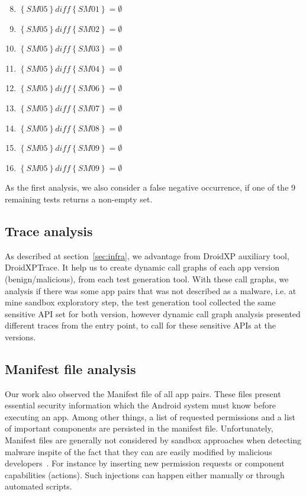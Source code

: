 \begin{enumerate}[(Test 1)] \setcounter{enumi}{7}
 \item {$\left\{SM05\right\} \textit{diff} \left\{SM01\right\} = \emptyset$}
 \item {$\left\{SM05\right\} \textit{diff} \left\{SM02\right\} = \emptyset$}
 \item {$\left\{SM05\right\} \textit{diff} \left\{SM03\right\} = \emptyset$}
 \item {$\left\{SM05\right\} \textit{diff} \left\{SM04\right\} = \emptyset$}
 \item {$\left\{SM05\right\} \textit{diff} \left\{SM06\right\} = \emptyset$}
 \item {$\left\{SM05\right\} \textit{diff} \left\{SM07\right\} = \emptyset$}
 \item {$\left\{SM05\right\} \textit{diff} \left\{SM08\right\} = \emptyset$}
 \item {$\left\{SM05\right\} \textit{diff} \left\{SM09\right\} = \emptyset$}
 \item {$\left\{SM05\right\} \textit{diff} \left\{SM09\right\} = \emptyset$}
\end{enumerate}

As the first analysis, we also consider a false negative occurrence, if one of the 9 remaining tests returns a non-empty set.

\subsection{Trace analysis} \label{sec:trace}

As described at section~\ref{sec:infra}, we advantage from DroidXP auxiliary tool, DroidXPTrace. It help us to create dynamic call graphs of each app version (benign/malicious), from each test generation tool. With these call graphs, we analysis if there was some app pairs that was not described as a malware, i.e. at mine sandbox exploratory step, the test generation tool collected the same sensitive API set for both version, however dynamic call graph analysis presented different traces from the entry point, to call for these sensitive APIs at the versions.


\subsection{Manifest file analysis}\label{sec:manifestAnalysis}

Our work also observed the Manifest file of all app pairs. These files present essential security information which the Android system must know before executing an app. Among other things, a  list of requested permissions and a list of important components are persisted in the manifest file. Unfortunately, Manifest files are generally not considered by sandbox approaches when detecting malware inspite of the fact that they can are easily modified by malicious developers~\cite{DBLP:journals/corr/abs-1208-4536}. For instance by inserting new permission requests or component capabilities (actions). Such injections can happen either manually or through automated scripts.

